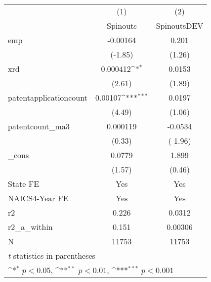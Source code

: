 {
\def\sym#1{\ifmmode^{#1}\else\(^{#1}\)\fi}
\begin{tabular}{l*{2}{c}}
\hline\hline
            &\multicolumn{1}{c}{(1)}&\multicolumn{1}{c}{(2)}\\
            &\multicolumn{1}{c}{Spinouts}&\multicolumn{1}{c}{SpinoutsDEV}\\
\hline
emp         &    -0.00164         &       0.201         \\
            &     (-1.85)         &      (1.26)         \\
[1em]
xrd         &    0.000412\sym{*}  &      0.0153         \\
            &      (2.61)         &      (1.89)         \\
[1em]
patentapplicationcount&     0.00107\sym{***}&      0.0197         \\
            &      (4.49)         &      (1.06)         \\
[1em]
patentcount\_ma3&    0.000119         &     -0.0534         \\
            &      (0.33)         &     (-1.96)         \\
[1em]
\_cons      &      0.0779         &       1.899         \\
            &      (1.57)         &      (0.46)         \\
[1em]
State FE    &         Yes         &         Yes         \\
[1em]
NAICS4-Year FE&         Yes         &         Yes         \\
\hline
r2          &       0.226         &      0.0312         \\
r2\_a\_within &       0.151         &     0.00306         \\
N           &       11753         &       11753         \\
\hline\hline
\multicolumn{3}{l}{\footnotesize \textit{t} statistics in parentheses}\\
\multicolumn{3}{l}{\footnotesize \sym{*} \(p<0.05\), \sym{**} \(p<0.01\), \sym{***} \(p<0.001\)}\\
\end{tabular}
}
